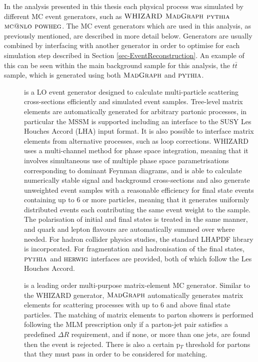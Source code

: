 In the analysis presented in this thesis each physical process was simulated by different MC event generators, such as ${\textsc{WHIZARD}}$ $\textsc{MadGraph}$ ${\textsc{pythia}}$ $\textsc{mc@nlo}$ ${\textsc{powheg}}$. The MC event generators which are used in this analysis, as previously mentioned, are described in more detail below. Generators are usually combined by interfacing with another generator in order to optimise for each simulation step described in Section \ref{sec-EventReconstruction}. An example of this can be seen within the main background sample for this analysis, the $t\bar{t}$ sample, which is generated using both $\textsc{MadGraph}$ and ${\textsc{pythia}}$.   

\begin{description}

	\item[\WHIZARD] \cite{WHIZARD} is a LO event generator designed to calculate multi-particle scattering cross-sections efficiently and simulated event samples. Tree-level matrix elements are automatically generated for arbitrary partonic processes, in particular the MSSM is supported including an interface to the SUSY Les Houches Accord (LHA) input format. It is also possible to interface matrix elements from alternative processes, such as loop corrections. WHIZARD uses a multi-channel method for phase space integration, meaning that it involves simultaneous use of multiple phase space parametrisations corresponding to dominant Feynman diagrams, and is able to calculate numerically stable signal and background cross-sections and also generate unweighted event samples with a reasonable efficiency for final state events containing up to 6 or more particles, meaning that it generates uniformly distributed events each contributing the same event weight to the sample. The polarisation of initial and final states is treated in the same manner, and quark and lepton flavours are automatically summed over where needed. For hadron collider physics studies, the standard LHAPDF library is incorporated. For fragmentation and hadronisation of the final states, ${\textsc{pythia}}$ and ${\textsc{herwig}}$ interfaces are provided, both of which follow the Les Houches Accord. 

	\item[\MADGRAPH] \cite{MADGRAPH5} is a leading order multi-purpose matrix-element MC generator. Similar to the WHIZARD generator, $\textsc{MadGraph}$ automatically generates matrix elements for scattering processes with up to 6 and above final state particles. The matching of matrix elements to parton showers is performed following the MLM prescription \cite{Hoche:2006ph} only if a parton-jet pair satisfies a predefined $\Delta R$ requirement, and if none, or more than one jets, are found then the event is rejected. There is also a certain p$_T$ threshold for partons that they must pass in order to be considered for matching.


\end{description}
